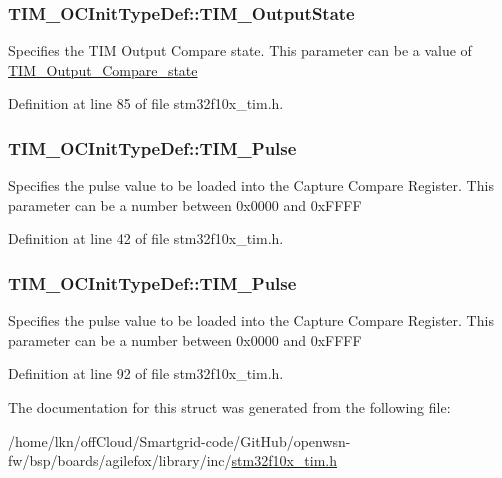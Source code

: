 \subsubsection[{\texorpdfstring{T\+I\+M\+\_\+\+Output\+State}{TIM_OutputState}}]{ T\+I\+M\+\_\+\+O\+C\+Init\+Type\+Def\+::\+T\+I\+M\+\_\+\+Output\+State}\hypertarget{struct_t_i_m___o_c_init_type_def_a2baca9c02d214d3125635a74e8d9aee4}{}\label{struct_t_i_m___o_c_init_type_def_a2baca9c02d214d3125635a74e8d9aee4}
Specifies the T\+IM Output Compare state. This parameter can be a value of \hyperlink{group___t_i_m___output___compare__state}{T\+I\+M\+\_\+\+Output\+\_\+\+Compare\+\_\+state} 

Definition at line 85 of file stm32f10x\+\_\+tim.\+h.

\subsubsection[{\texorpdfstring{T\+I\+M\+\_\+\+Pulse}{TIM_Pulse}}]{ T\+I\+M\+\_\+\+O\+C\+Init\+Type\+Def\+::\+T\+I\+M\+\_\+\+Pulse}\hypertarget{struct_t_i_m___o_c_init_type_def_ad2f91a27da1e29a3383952d5e287aab2}{}\label{struct_t_i_m___o_c_init_type_def_ad2f91a27da1e29a3383952d5e287aab2}
Specifies the pulse value to be loaded into the Capture Compare Register. This parameter can be a number between 0x0000 and 0x\+F\+F\+FF 

Definition at line 42 of file stm32f10x\+\_\+tim.\+h.

\subsubsection[{\texorpdfstring{T\+I\+M\+\_\+\+Pulse}{TIM_Pulse}}]{ T\+I\+M\+\_\+\+O\+C\+Init\+Type\+Def\+::\+T\+I\+M\+\_\+\+Pulse}\hypertarget{struct_t_i_m___o_c_init_type_def_a186a3729af4e52f73f96590d805412a3}{}\label{struct_t_i_m___o_c_init_type_def_a186a3729af4e52f73f96590d805412a3}
Specifies the pulse value to be loaded into the Capture Compare Register. This parameter can be a number between 0x0000 and 0x\+F\+F\+FF 

Definition at line 92 of file stm32f10x\+\_\+tim.\+h.



The documentation for this struct was generated from the following file\+:\begin{DoxyCompactItemize}
\item 
/home/lkn/off\+Cloud/\+Smartgrid-\/code/\+Git\+Hub/openwsn-\/fw/bsp/boards/agilefox/library/inc/\hyperlink{agilefox_2library_2inc_2stm32f10x__tim_8h}{stm32f10x\+\_\+tim.\+h}\end{DoxyCompactItemize}
